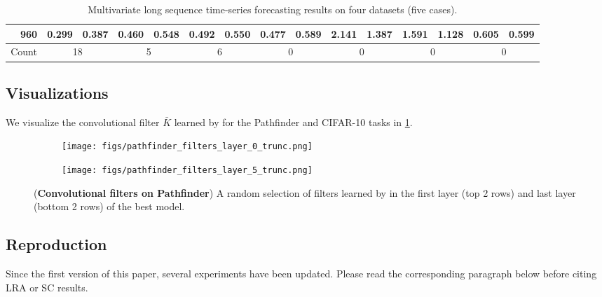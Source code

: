 \begin{table*}[t]
{\begin{tabular}{c|c|cc|cc|cc|cc|cc|cc|cc}
                                          & 960                                        & \textbf{0.299}                & \textbf{0.387}                         & {0.460}                       & {0.548}                       & 0.492                      & 0.550                        & 0.477   & 0.589 & 2.141 & 1.387 & 1.591 & 1.128 & 0.605    & 0.599 \\
\midrule[1.0pt]
\multicolumn{2}{c}{Count}                 & \multicolumn{2}{|c}{18}                    & \multicolumn{2}{|c}{5}        & \multicolumn{2}{|c}{6}                 & \multicolumn{2}{|c}{0}        & \multicolumn{2}{|c}{0}        & \multicolumn{2}{|c}{0}     & \multicolumn{2}{|c}{0}      \\
\bottomrule[1.0pt]

\end{tabular}%
}
\caption{Multivariate long sequence time-series forecasting results on four datasets (five cases).}
\label{tab:informer-m}
\end{table*}


\subsection{Visualizations}
We visualize the convolutional filter $\bar{K}$ learned by \methodabbrv{} for the Pathfinder and CIFAR-10 tasks in \cref{fig:pathfinder-all-conv-filters}.

\begin{figure}
    \centering
    \begin{subfigure}{\linewidth}
        \texttt{[image: figs/pathfinder\_filters\_layer\_0\_trunc.png]}
    \end{subfigure}
    \begin{subfigure}{\linewidth}
        \texttt{[image: figs/pathfinder\_filters\_layer\_5\_trunc.png]}
    \end{subfigure}
    \label{fig:pathfinder-all-conv-filters}
    \caption{({\bf Convolutional filters on Pathfinder}) A random selection of filters learned by \methodabbrv{} in the first layer (top 2 rows) and last layer (bottom 2 rows) of the best model.}
\end{figure}

\subsection{Reproduction}
\label{sec:reproduction}

Since the first version of this paper, several experiments have been updated. Please read the corresponding paragraph below before citing LRA or SC results.

